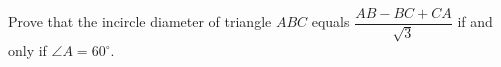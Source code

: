Prove that the incircle diameter of triangle $ABC$ equals $\dfrac{AB-BC+CA}{\sqrt3}$ if and only if $\angle A=60^\circ$.
